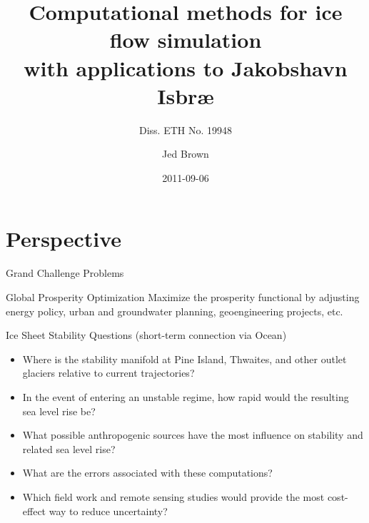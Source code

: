 \documentclass{beamer}
\title{Computational methods for ice flow simulation \\
with applications to Jakobshavn Isbr{\ae}}
\subtitle{Diss. ETH No. 19948}
\author{Jed Brown}
\institute
{VAW, ETH Z\"urich}
\date{2011-09-06}
\begin{document}
\lstset{language=C}
\normalem

\begin{frame}
  \titlepage
\end{frame}

\section{Perspective}
\begin{frame}{Grand Challenge Problems}
  \begin{block}{Global Prosperity Optimization}
    Maximize the prosperity functional by adjusting energy policy, urban and groundwater planning, geoengineering projects, etc.
  \end{block}
  \begin{block}{Ice Sheet Stability Questions (short-term connection via Ocean)}
    \begin{itemize}
    \item Where is the stability manifold at Pine Island, Thwaites, and other outlet glaciers relative to current trajectories?
    \item In the event of entering an unstable regime, how rapid would the resulting sea level rise be?
    \item What possible anthropogenic sources have the most influence on stability and related sea level rise?
    \item What are the errors associated with these computations?
    \item Which field work and remote sensing studies would provide the most cost-effect way to reduce uncertainty?
    \end{itemize}
  \end{block}
\end{frame}
\end{document}
